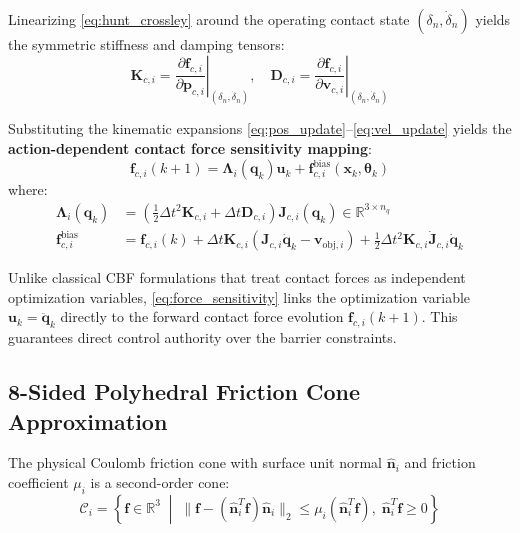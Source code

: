Linearizing \eqref{eq:hunt_crossley} around the operating contact state $(\delta_n, \dot{\delta}_n)$ yields the symmetric stiffness and damping tensors:
\begin{equation}
    \mathbf{K}_{c, i} = \left. \frac{\partial \mathbf{f}_{c, i}}{\partial \mathbf{p}_{c, i}} \right|_{(\delta_n, \dot{\delta}_n)}, \quad \mathbf{D}_{c, i} = \left. \frac{\partial \mathbf{f}_{c, i}}{\partial \mathbf{v}_{c, i}} \right|_{(\delta_n, \dot{\delta}_n)}
\end{equation}

Substituting the kinematic expansions \eqref{eq:pos_update}--\eqref{eq:vel_update} yields the \textbf{action-dependent contact force sensitivity mapping}:
\begin{equation}
    \mathbf{f}_{c, i}(k+1) = \mathbf{\Lambda}_i(\mathbf{q}_k) \mathbf{u}_k + \mathbf{f}_{c, i}^{\text{bias}}(\mathbf{x}_k, \boldsymbol{\theta}_k)
    \label{eq:force_sensitivity}
\end{equation}
where:
\begin{align}
    \mathbf{\Lambda}_i(\mathbf{q}_k) &= \left( \frac{1}{2} \Delta t^2 \mathbf{K}_{c, i} + \Delta t \mathbf{D}_{c, i} \right) \mathbf{J}_{c, i}(\mathbf{q}_k) \in \mathbb{R}^{3 \times n_q} \label{eq:lambda_def} \\
    \mathbf{f}_{c, i}^{\text{bias}} &= \mathbf{f}_{c, i}(k) + \Delta t \mathbf{K}_{c, i} \left( \mathbf{J}_{c, i} \dot{\mathbf{q}}_k - \mathbf{v}_{\text{obj}, i} \right) + \frac{1}{2} \Delta t^2 \mathbf{K}_{c, i} \dot{\mathbf{J}}_{c, i} \dot{\mathbf{q}}_k \label{eq:bias_def}
\end{align}

\begin{remark}
Unlike classical CBF formulations that treat contact forces as independent optimization variables, \eqref{eq:force_sensitivity} links the optimization variable $\mathbf{u}_k = \ddot{\mathbf{q}}_k$ directly to the forward contact force evolution $\mathbf{f}_{c, i}(k+1)$. This guarantees direct control authority over the barrier constraints.
\end{remark}

\subsection{8-Sided Polyhedral Friction Cone Approximation}
The physical Coulomb friction cone with surface unit normal $\hat{\mathbf{n}}_i$ and friction coefficient $\mu_i$ is a second-order cone:
\begin{equation}
    \mathcal{C}_i = \left\{ \mathbf{f} \in \mathbb{R}^3 \;\middle|\; \|\mathbf{f} - (\hat{\mathbf{n}}_i^T \mathbf{f}) \hat{\mathbf{n}}_i\|_2 \le \mu_i (\hat{\mathbf{n}}_i^T \mathbf{f}), \; \hat{\mathbf{n}}_i^T \mathbf{f} \ge 0 \right\}
\end{equation}

